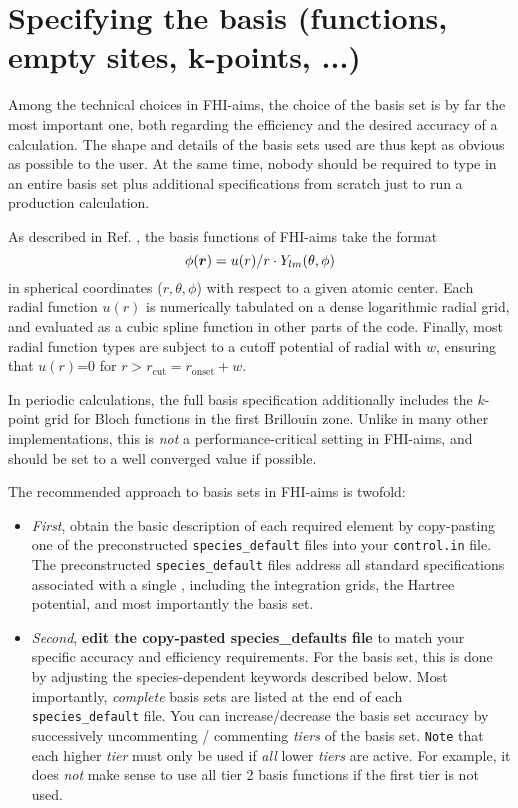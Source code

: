 \section{Specifying the basis (functions, empty sites, k-points, ...)}

Among the technical choices in FHI-aims, the choice of the basis set
is by far the most important one, both regarding the efficiency and
the desired accuracy of a calculation. The shape and details of the
basis sets used are thus kept as obvious as possible to the user. At
the same time, nobody should be required to type in an entire
basis set plus additional specifications from scratch just to run a
production calculation. 

As described in Ref. \cite{Blum08}, the basis functions of FHI-aims
take the format
\begin{equation}
  \phi(\mbox{\boldmath$r$}) = u(r)/r \cdot Y_{lm}(\theta,\phi)
\end{equation}
in spherical coordinates ($r,\theta,\phi$) with respect to a given
atomic center. Each radial function $u(r)$ is numerically tabulated on
a dense logarithmic radial grid, and evaluated as a cubic spline
function in other parts of the code. Finally, most radial function
types are subject to a cutoff potential of radial with $w$, ensuring
that $u(r)$=0 for $r>r_\text{cut}=r_\text{onset}+w$.

In periodic calculations, the full basis specification additionally
includes the $k$-point grid for Bloch functions in the first Brillouin
zone. Unlike in many other implementations, this is \emph{not} a
performance-critical setting in FHI-aims, and should be set to a well
converged value if possible.

The recommended approach to basis sets in FHI-aims is 
twofold:
\begin{itemize}
  \item \emph{First}, obtain the basic description of each required
    element by copy-pasting one of the preconstructed
    \texttt{species\_default} files into your \texttt{control.in}
    file. The preconstructed \texttt{species\_default} files address
    all standard specifications associated with a single
    , including the integration grids, the Hartree
    potential, and most importantly the basis set. 
  \item \emph{Second}, \textbf{edit the copy-pasted species\_defaults
    file} to match your specific accuracy and efficiency
    requirements. For the basis set, this is done by adjusting the
    species-dependent keywords described below. Most importantly,
    \emph{complete} basis sets are listed at the end of each
    \texttt{species\_default} file. You can increase/decrease the
    basis set accuracy by successively uncommenting / commenting
    \emph{tiers} of the basis set. \texttt{Note} that each higher
    \emph{tier} must only be used if \emph{all} lower \emph{tiers} are
    active. For example, it does \emph{not} make sense to use all tier
    2 basis functions if the first tier is not used.
\end{itemize}


